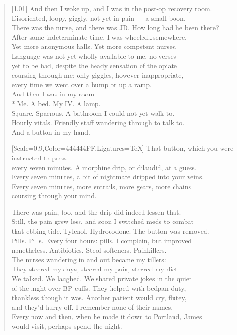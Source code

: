 \begin{verse}[1.01\textwidth]
  And then I woke up, and I was in the post-op recovery room.\\
  Disoriented, loopy, giggly, not yet in pain --- a small boon.\\
  There was the nurse, and there was JD. How long had he been there?\\
  After some indeterminate time, I was wheeled\ldots{}somewhere.\\
  Yet more anonymous halls. Yet more competent nurses.\\
  Language was not yet wholly available to me, no verses\\
  yet to be had, despite the heady sensation of the opiate\\
  coursing through me; only giggles, however inappropriate,\\
  every time we went over a bump or up a ramp.\\
  And then I was in my room.\\*
   Me. A bed. My IV. A lamp.\\
  Square. Spacious. A bathroom I could not yet walk to.\\
  Hourly vitals. Friendly staff wandering through to talk to.\\
  And a button in my hand.

  {[Scale=0.9,Color=444444FF,Ligatures=TeX]
  \vin That button, which you were instructed to press\\
  \vin every seven minutes. A morphine drip, or dilaudid, at a guess.\\
  \vin Every seven minutes, a bit of nightmare dripped into your veins.\\
  \vin Every seven minutes, more entrails, more gears, more chains\\
  \vin coursing through your mind.}

  There was pain, too, and the drip did indeed lessen that.\\
  Still, the pain grew less, and soon I switched meds to combat\\
  that ebbing tide. Tylenol. Hydrocodone. The button was removed.\\
  Pills. Pills. Every four hours: pills. I complain, but improved\\
  nonetheless. Antibiotics. Stool softeners. Painkillers.\\
  The nurses wandering in and out became my tillers:\\
  They steered my days, steered my pain, steered my diet.\\\newpage
  We talked. We laughed. We shared private jokes in the quiet\\
  of the night over BP cuffs. They helped with bedpan duty,\\
  thankless though it was. Another patient would cry, flutey,\\
  and they'd hurry off. I remember none of their names.\\
  Every now and then, when he made it down to Portland, James\\
  would visit, perhaps spend the night.


\end{verse}

